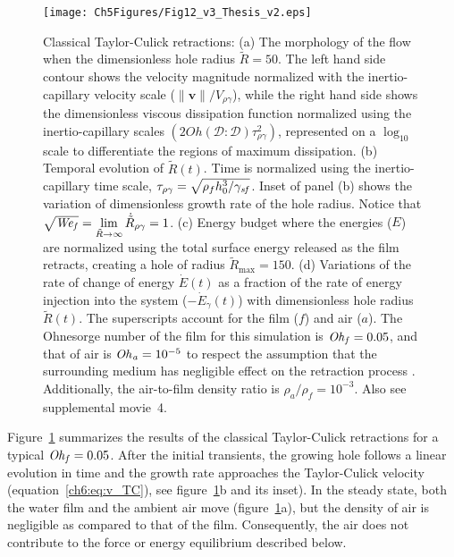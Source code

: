 \begin{subappendices}
	\begin{figure}
		\centering
		\texttt{[image: Ch5Figures/Fig12\_v3\_Thesis\_v2.eps]}	
		\caption{Classical Taylor-Culick retractions: (a) The morphology of the flow when the dimensionless hole radius $\tilde{R} = 50$. The left hand side contour shows the velocity magnitude normalized with the inertio-capillary velocity scale ($\|\boldsymbol{v}\|/V_{\rho\gamma}$), while the right hand side shows the dimensionless viscous dissipation function normalized using the inertio-capillary scales $\left(2Oh\left(\boldsymbol{\mathcal{D}:\mathcal{D}}\right)\tau_{\rho\gamma}^2\right)$, represented on a $\log_{\text{10}}$ scale to differentiate the regions of maximum dissipation. (b) Temporal evolution of $\tilde{R}(t)$. Time is normalized using the inertio-capillary time scale, $\tau_{\rho\gamma} = \sqrt{\rho_f h_0^3/\gamma_\mathit{sf}}$. Inset of panel (b) shows the variation of dimensionless growth rate of the hole radius. Notice that $\sqrt{\mathit{We}_\mathit{f}} = \lim\limits_{\tilde{R} \to \infty}\dot{\tilde{R}}_{\rho\gamma} = 1$. (c) Energy budget where the energies ($E$) are normalized using the total surface energy released as the film retracts, creating a hole of radius $\tilde{R}_{\text{max}} = 150$. (d) Variations of the rate of change of energy $\dot{E}(t)$ as a fraction of the rate of energy injection into the system ($-\dot{E}_\gamma (t)$) with dimensionless hole radius $\tilde{R}(t)$. The superscripts account for the film ($f$) and air ($a$). The Ohnesorge number of the film for this simulation is $\mathit{Oh}_\mathit{f} = 0.05$, and that of air is $\mathit{Oh}_\mathit{a} = 10^{-5}$ to respect the assumption that the surrounding medium has negligible effect on the retraction process \citep{taylor-1959-procrsoclonda, culick-1960-japplphys}. Additionally, the air-to-film density ratio is $\rho_a/\rho_f = 10^{-3}$. Also see supplemental movie~{\color{Myfig}4}.}
		\label{fig:ClassicalTC}
	\end{figure}
	
	Figure~\ref{fig:ClassicalTC} summarizes the results of the classical Taylor-Culick retractions for a typical $\mathit{Oh}_\mathit{f} = 0.05$. After the initial transients, the growing hole follows a linear evolution in time and the growth rate approaches the Taylor-Culick velocity (equation~\eqref{ch6:eq:v_TC}), see figure~\ref{fig:ClassicalTC}b and its inset). In the steady state, both the water film and the ambient air move (figure~\ref{fig:ClassicalTC}a), but the density of air is negligible as compared to that of the film. Consequently, the air does not contribute to the force or energy equilibrium described below. 
	

\end{subappendices}
